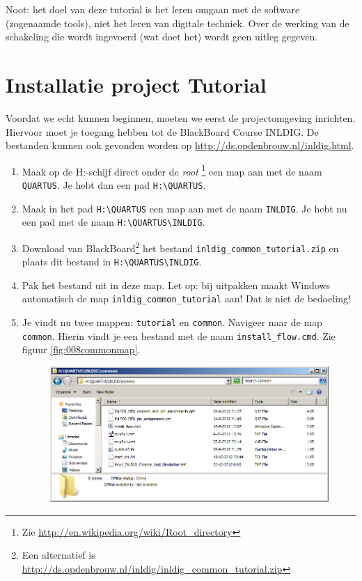 \documentclass[a4paper,12pt,fleqn,twoside]{book}
\def\tutpicscale{0.455}
\begin{document}
Noot: het doel van deze tutorial is het leren omgaan met de software
(zogenaamde tools), niet het leren van digitale techniek. Over de werking van
de schakeling die wordt ingevoerd (wat doet het) wordt geen uitleg gegeven.


\section{Installatie project Tutorial}
\label{sec:installatieprojecttutorial}
Voordat we echt kunnen beginnen, moeten we eerst de projectomgeving inrichten.
Hiervoor moet je toegang hebben tot de BlackBoard Course INLDIG. De bestanden
kunnen ook gevonden worden op \url{http://ds.opdenbrouw.nl/inldig.html}.

\begin{enumerate}\itemsep-1pt
\item Maak op de H:-schijf direct onder de \textsl{root}%
      \footnote{Zie \url{http://en.wikipedia.org/wiki/Root_directory}} een map
      aan met de naam \lstinline|QUARTUS|. Je hebt dan een pad
      \lstinline|H:\QUARTUS|.
\item Maak in het pad \lstinline|H:\QUARTUS| een map aan met de naam
      \lstinline|INLDIG|. Je hebt nu een pad met de naam
      \lstinline|H:\QUARTUS\INLDIG|.
\item Download van BlackBoard\footnote{Een alternatief is
      \url{http://ds.opdenbrouw.nl/inldig/inldig_common_tutorial.zip}} het
      bestand \lstinline|inldig_common_tutorial.zip| en plaats dit bestand in
      \lstinline|H:\QUARTUS\INLDIG|. 
\item Pak het bestand uit in deze map. Let op: bij uitpakken maakt Windows
      automatisch de map \lstinline|inldig_common_tutorial| aan! Dat is niet
      de bedoeling!
\item Je vindt nu twee mappen: \lstinline|tutorial| en \lstinline|common|.
      Navigeer naar de map \lstinline|common|. Hierin vindt je een bestand met
      de naam \lstinline|install_flow.cmd|. Zie figuur \ref{fig:008commonmap}.
\begin{figure}[H]
\centering
\includegraphics[scale=\tutpicscale]{008commonmap}

\end{figure}
\end{enumerate}
\end{document}
